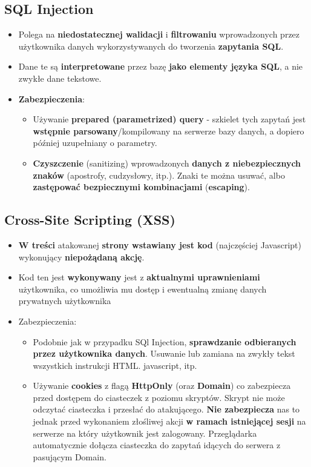 \documentclass[../main.tex]{subfiles}
\begin{document}
    \subsection{SQL Injection}
    \begin{itemize}
        \item Polega na \textbf{niedostatecznej walidacji} i \textbf{filtrowaniu} wprowadzonych przez
        użytkownika danych wykorzystywanych do tworzenia \textbf{zapytania SQL}.
        \item Dane te są \textbf{interpretowane} przez bazę \textbf{jako elementy języka SQL}, a nie
        zwykłe dane tekstowe.
        \item \textbf{Zabezpieczenia}:
        \begin{itemize}
            \item Używanie \textbf{prepared (parametrized) query} - szkielet tych zapytań jest \textbf{wstępnie parsowany}/kompilowany na serwerze
            bazy danych, a dopiero później uzupełniany o parametry.
            \item \textbf{Czyszczenie} (sanitizing) wprowadzonych \textbf{danych z niebezpiecznych znaków}
            (apostrofy, cudzysłowy, itp.). Znaki te można usuwać, albo \textbf{zastępować bezpiecznymi kombinacjami} (\textbf{escaping}).
        \end{itemize}
    \end{itemize}

    \subsection{Cross-Site Scripting (XSS)}
    \begin{itemize}
        \item \textbf{W treści} atakowanej \textbf{strony wstawiany jest kod} (najczęściej Javascript)
        wykonujący \textbf{niepożądaną akcję}.
        \item Kod ten jest \textbf{wykonywany} jest z \textbf{aktualnymi uprawnieniami} użytkownika, co
        umożliwia mu dostęp i ewentualną zmianę danych prywatnych użytkownika
        \item Zabezpieczenia:
        \begin{itemize}
            \item Podobnie jak w przypadku SQl Injection, \textbf{sprawdzanie odbieranych przez
            użytkownika danych}. Usuwanie lub zamiana na zwykły tekst wszystkich
            instrukcji HTML. javascript, itp.
            \item Używanie \textbf{cookies} z flagą \textbf{HttpOnly} (oraz \textbf{Domain}) co zabezpiecza przed
            dostępem do ciasteczek z poziomu skryptów. Skrypt nie może odczytać
            ciasteczka i przesłać do atakującego.
            \textbf{Nie zabezpiecza} nas to jednak przed wykonaniem złośliwej akcji \textbf{w
            ramach istniejącej sesji} na serwerze na który użytkownik jest zalogowany.
            Przeglądarka automatycznie dołącza ciasteczka do zapytań idących do
            serwera z pasującym Domain.
        \end{itemize}
    \end{itemize}
\end{document}

